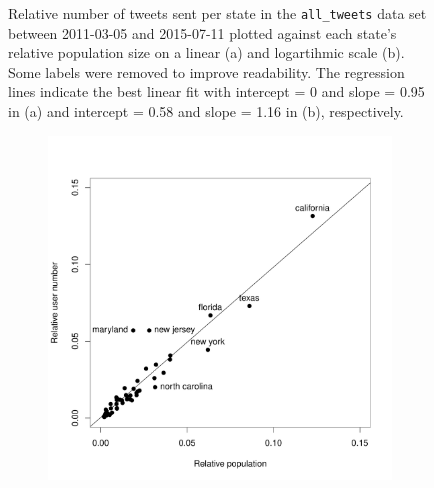 \documentclass[11pt, a4paper,twoside]{report}\usepackage[]{graphicx}\usepackage[]{color}
\begin{document}
\begin{figure}[H]
\caption{Relative number of tweets sent per state in the \texttt{all\_tweets} data set between 2011-03-05 and 2015-07-11 plotted against each state's relative population size on a linear (a) and logartihmic scale (b). Some labels were removed to improve readability. The regression lines indicate the best linear fit with intercept = 0 and slope = 0.95 in (a) and intercept = 0.58 and slope = 1.16 in (b), respectively.}
\end{figure}

\begin{figure}[H]
\centering
 \begin{subfigure}[t]{0.6\textwidth}
  \includegraphics[width=1\linewidth]{18_ScatterTweetPop_user.pdf}
  \caption{}
  \label{fig:tweets_state_full_scatter_user}
  \end{subfigure}
  

\end{figure}
\end{document}
